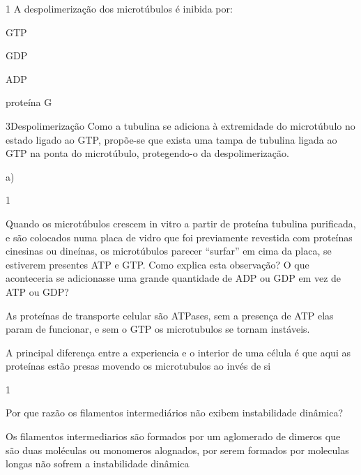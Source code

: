 \documentclass[\mainfilename]{subfiles}
\begin{document}
\begin{questionBox}1{} %
    A despolimerização dos microtúbulos é inibida por:
    \begin{enumerate}[label=\alph{enumi})]
        \begin{multicols}{2}
            \item GTP
            \item GDP
            \item ADP
            \item proteína G
        \end{multicols}
    \end{enumerate}

    \begin{questionBox}3{Despolimerização} %
        Como a tubulina se adiciona à extremidade do microtúbulo no estado ligado ao GTP, propõe-se que exista uma tampa de tubulina ligada ao GTP na ponta do microtúbulo, protegendo-o da despolimerização.
    \end{questionBox}

    \begin{answerBox}{} %
        a)
    \end{answerBox}
\end{questionBox}

\begin{questionBox}1{} %

    Quando os microtúbulos crescem in vitro a partir de proteína tubulina purificada, e são colocados numa placa de vidro que foi previamente revestida com proteínas cinesinas ou dineínas, os microtúbulos parecer “surfar” em cima da placa, se estiverem presentes ATP e GTP. Como explica esta observação? O que aconteceria se adicionasse uma grande quantidade de ADP ou GDP em vez de ATP ou GDP?

    \begin{answerBox}{} %
        As proteínas de transporte celular são ATPases, sem a presença de ATP elas param de funcionar, e sem o GTP os microtubulos se tornam instáveis.

        A principal diferença entre a experiencia e o interior de uma célula é que aqui as proteínas estão presas movendo os microtubulos ao invés de si
    \end{answerBox}

\end{questionBox}

\begin{questionBox}1{} %

    Por que razão os filamentos intermediários não exibem instabilidade dinâmica?

    \begin{answerBox}{} %
        Os filamentos intermediarios são formados por um aglomerado de dimeros que são duas moléculas ou monomeros alognados, por serem formados por moleculas longas não sofrem a instabilidade dinâmica
    \end{answerBox}

\end{questionBox}
\end{document}
